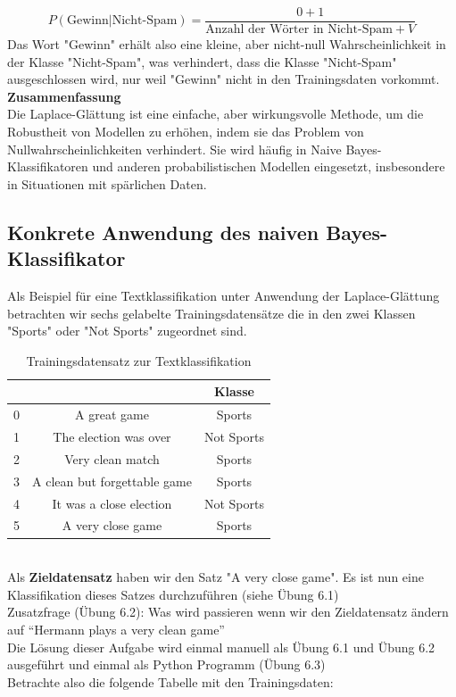 \documentclass[12pt]{article}
\begin{document}
\[
P(\text{Gewinn}|\text{Nicht-Spam}) = \frac{0 + 1}{\text{Anzahl der Wörter in Nicht-Spam} + V}
\]
%
Das Wort "Gewinn" erhält also eine kleine, aber nicht-null Wahrscheinlichkeit in der Klasse "Nicht-Spam", was verhindert, dass die Klasse "Nicht-Spam" ausgeschlossen wird, nur weil "Gewinn" nicht in den Trainingsdaten vorkommt.\\[0.2cm]
\textbf{Zusammenfassung}\\
Die Laplace-Glättung ist eine einfache, aber wirkungsvolle Methode, um die Robustheit von Modellen zu erhöhen, indem sie das Problem von Nullwahrscheinlichkeiten verhindert. Sie wird häufig in Naive Bayes-Klassifikatoren und anderen probabilistischen Modellen eingesetzt, insbesondere in Situationen mit spärlichen Daten.\\

\subsection{Konkrete Anwendung des naiven Bayes-Klassifikator}

Als Beispiel für eine Textklassifikation unter Anwendung der Laplace-Glättung betrachten wir sechs gelabelte Trainingsdatensätze die in den zwei Klassen "Sports" oder "Not Sports" zugeordnet sind. 
\begin{table}[h]
\centering
  \caption{Trainingsdatensatz zur Textklassifikation}
  \label{tab:Textklassifikation-Datensatz}
\begin{tabular}{|c|c|c|}
\hline  
\color{black}{No.} & \color{blue}{Trainingsdatensatz} & \color{red} {Klasse} \\
\hline
0 & A great game & Sports \\
1 & The election was over & Not Sports \\
2 & Very clean match & Sports \\
3 & A clean but forgettable game & Sports \\
4 & It was a close election & Not Sports \\
5 & A very close game & Sports \\
\hline
\end{tabular}
\end{table}\\[0.1cm]
% 
Als \textbf{Zieldatensatz} haben wir den Satz "A very close game". Es ist nun eine Klassifikation dieses Satzes durchzuführen (siehe Übung 6.1)\\
Zusatzfrage (Übung 6.2): Was wird passieren wenn wir den Zieldatensatz ändern auf  “Hermann plays a very clean game”\\
Die Lösung dieser Aufgabe wird einmal manuell als Übung 6.1 und Übung 6.2 ausgeführt und einmal als Python Programm (Übung 6.3)\\
Betrachte also die folgende Tabelle mit den Trainingsdaten:\\[0.2cm]
\end{document}
